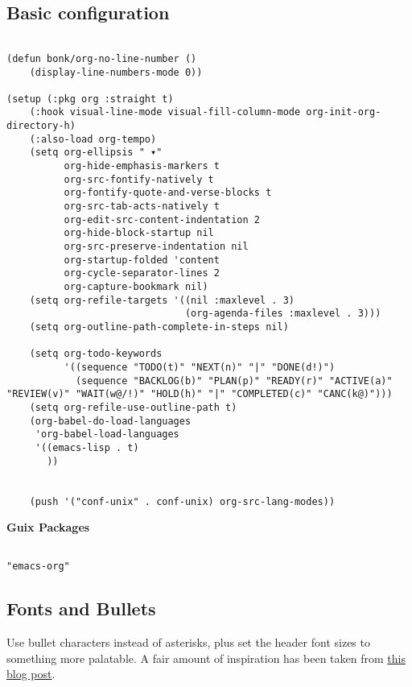 \documentclass[11pt]{article}
\begin{document}
\subsection{Basic configuration}
\label{sec:org2486a3c}
\begin{verbatim}

(defun bonk/org-no-line-number ()
    (display-line-numbers-mode 0))

(setup (:pkg org :straight t)
    (:hook visual-line-mode visual-fill-column-mode org-init-org-directory-h) 
    (:also-load org-tempo)
    (setq org-ellipsis " ▾"
          org-hide-emphasis-markers t
          org-src-fontify-natively t
          org-fontify-quote-and-verse-blocks t
          org-src-tab-acts-natively t
          org-edit-src-content-indentation 2
          org-hide-block-startup nil
          org-src-preserve-indentation nil
          org-startup-folded 'content
          org-cycle-separator-lines 2
          org-capture-bookmark nil)
    (setq org-refile-targets '((nil :maxlevel . 3)
                               (org-agenda-files :maxlevel . 3)))
    (setq org-outline-path-complete-in-steps nil)

    (setq org-todo-keywords
          '((sequence "TODO(t)" "NEXT(n)" "|" "DONE(d!)")
            (sequence "BACKLOG(b)" "PLAN(p)" "READY(r)" "ACTIVE(a)" "REVIEW(v)" "WAIT(w@/!)" "HOLD(h)" "|" "COMPLETED(c)" "CANC(k@)")))
    (setq org-refile-use-outline-path t)
    (org-babel-do-load-languages
     'org-babel-load-languages
     '((emacs-lisp . t)
       ))


    (push '("conf-unix" . conf-unix) org-src-lang-modes))

\end{verbatim}

\textbf{Guix Packages}

\begin{verbatim}

"emacs-org"

\end{verbatim}
\subsection{Fonts and Bullets}
\label{sec:org9ddf3d0}

Use bullet characters instead of asterisks, plus set the header font sizes to something more palatable.  A fair amount of inspiration has been taken from \href{https://zzamboni.org/post/beautifying-org-mode-in-emacs/}{this blog post}.
\end{document}
